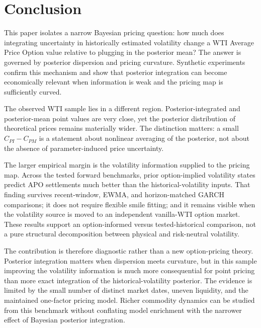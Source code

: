 \section{Conclusion}\label{sec:conclusion}

This paper isolates a narrow Bayesian pricing question: how much does integrating uncertainty in historically estimated volatility change a WTI Average Price Option value relative to plugging in the posterior mean? The answer is governed by posterior dispersion and pricing curvature. Synthetic experiments confirm this mechanism and show that posterior integration can become economically relevant when information is weak and the pricing map is sufficiently curved.

The observed WTI sample lies in a different region. Posterior-integrated and posterior-mean point values are very close, yet the posterior distribution of theoretical prices remains materially wider. The distinction matters: a small \(C_{PI}-C_{PM}\) is a statement about nonlinear averaging of the posterior, not about the absence of parameter-induced price uncertainty.

The larger empirical margin is the volatility information supplied to the pricing map. Across the tested forward benchmarks, prior option-implied volatility states predict APO settlements much better than the historical-volatility inputs. That finding survives recent-window, EWMA, and horizon-matched GARCH comparisons; it does not require flexible smile fitting; and it remains visible when the volatility source is moved to an independent vanilla-WTI option market. These results support an option-informed versus tested-historical comparison, not a pure structural decomposition between physical and risk-neutral volatility.

The contribution is therefore diagnostic rather than a new option-pricing theory. Posterior integration matters when dispersion meets curvature, but in this sample improving the volatility information is much more consequential for point pricing than more exact integration of the historical-volatility posterior. The evidence is limited by the small number of distinct market dates, uneven liquidity, and the maintained one-factor pricing model. Richer commodity dynamics can be studied from this benchmark without conflating model enrichment with the narrower effect of Bayesian posterior integration.
